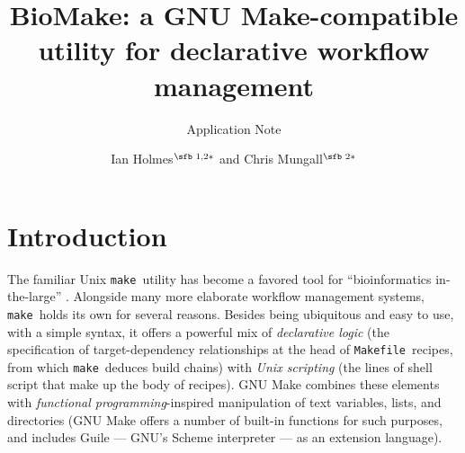 \documentclass{bioinfo}
\newcommand\Makefile{{\tt Makefile}}
\newcommand\make{{\tt make}}
\begin{document}

\subtitle{Application Note}

\title[BioMake: declarative workflow management]{BioMake: a GNU Make-compatible utility for declarative workflow management}
\author[Ian Holmes and Chris Mungall]{Ian Holmes$^{\text{\sfb 1,2}*}$ and Chris Mungall$^{\text{\sfb 2}*}$}
\address{$^{\text{\sf 1}}$Department of Bioengineering, University of California, Berkeley, CA 94720, USA and \\
$^{\text{\sf 2}}$Lawrence Berkeley National Laboratory, 1 Cyclotron Rd, Berkeley, CA 94720, USA.}


\history{}

\editor{}


\maketitle

\section*{Introduction}

The familiar Unix \make\ utility has become a favored tool for ``bioinformatics in-the-large'' \citep{ParkerGorlickLee2003}.
Alongside many more elaborate workflow management systems, \make\ holds its own for several reasons.
Besides being ubiquitous and easy to use, with a simple syntax, it offers a powerful mix
of {\em declarative logic} (the specification of target-dependency relationships at the head of \Makefile\ recipes, from which \make\ deduces build chains)
with {\em Unix scripting} (the lines of shell script that make up the body of recipes).
GNU Make combines these elements with {\em functional programming}-inspired manipulation of text variables, lists, and directories
(GNU Make offers a number of built-in functions for such purposes, and includes Guile --- GNU's Scheme interpreter --- as an extension language).
\end{document}
